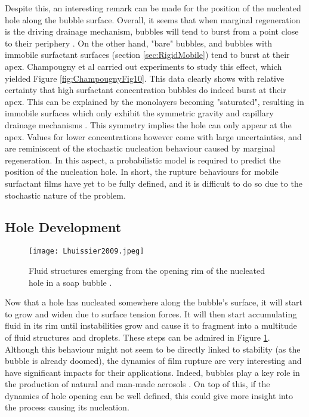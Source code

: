 \documentclass[a4paper,12pt]{article}
\numberwithin{equation}{section}
\numberwithin{figure}{section}
\numberwithin{table}{section}
\begin{document}
Despite this, an interesting remark can be made for the position of the nucleated hole along the bubble surface. Overall, it seems that when marginal regeneration is the driving drainage mechanism, bubbles will tend to burst from a point close to their periphery \cite{Bhamla2017, Lhuissier2011}. On the other hand, "bare" bubbles, and bubbles with immobile surfactant surfaces (section \ref{sec:RigidMobile}) tend to burst at their apex. Champougny et al \cite{ChampougnyNotBare2016} carried out experiments to study this effect, which yielded Figure \ref{fig:ChampougnyFig10}. This data clearly shows with relative certainty that high surfactant concentration bubbles do indeed burst at their apex. This can be explained by the monolayers becoming "saturated", resulting in immobile surfaces which only exhibit the symmetric gravity and capillary drainage mechanisms \cite{Bhamla2017}. This symmetry implies the hole can only appear at the apex. Values for lower concentrations however come with large uncertainties, and are reminiscent of the stochastic nucleation behaviour caused by marginal regeneration. In this aspect, a probabilistic model is required to predict the position of the nucleation hole. In short, the rupture behaviours for mobile surfactant films have yet to be fully defined, and it is difficult to do so due to the stochastic nature of the problem.

\subsection{Hole Development}

\begin{figure}[!htbp]
    \centering
    \captionsetup{width=.9\linewidth}
    \texttt{[image: Lhuissier2009.jpeg]}
    \caption{Fluid structures emerging from the opening rim of the nucleated hole in a soap bubble \cite{Lhuissier2009}.}
    \label{fig:Lhuissier2009}
\end{figure}

Now that a hole has nucleated somewhere along the bubble's surface, it will start to grow and widen due to surface tension forces. It will then start accumulating fluid in its rim until instabilities grow and cause it to fragment into a multitude of fluid structures and droplets. These steps can be admired in Figure \ref{fig:Lhuissier2009}. Although this behaviour might not seem to be directly linked to stability (as the bubble is already doomed), the dynamics of film rupture are very interesting and have significant impacts for their applications. Indeed, bubbles play a key role in the production of natural and man-made aerosols \cite{Lhuissier2011, Modini2013}. On top of this, if the dynamics of hole opening can be well defined, this could give more insight into the process causing its nucleation.
\end{document}
